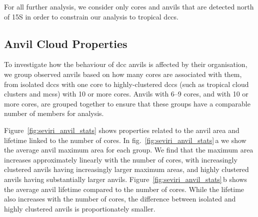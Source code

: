 For all further analysis, we consider only cores and anvils that are detected north of 15\textdegree S in order to constrain our analysis to tropical \acrshort{dcc}s.

\subsection{Anvil Cloud Properties}

To investigate how the behaviour of \acrshort{dcc} anvils is affected by their organisation, we group observed anvils based on how many cores are associated with them, from isolated \acrshort{dcc}s with one core to highly-clustered \acrshort{dcc}s (such as tropical cloud clusters and \acrshort{mcs}s) with 10 or more cores. 
Anvils with 6--9 cores, and with 10 or more cores, are grouped together to ensure that these groups have a comparable number of members for analysis.

Figure~\ref{fig:seviri_anvil_stats} shows properties related to the anvil area and lifetime linked to the number of cores. 
In fig.~\ref{fig:seviri_anvil_stats}\,a we show the average anvil maximum area for each group. 
We find that the maximum area increases approximately linearly with the number of cores, with increasingly clustered anvils having increasingly larger maximum areas, and highly clustered anvils having substantially larger anvils. 
Figure~\ref{fig:seviri_anvil_stats}\,b shows the average anvil lifetime compared to the number of cores. 
While the lifetime also increases with the number of cores, the difference between isolated and highly clustered anvils is proportionately smaller.


